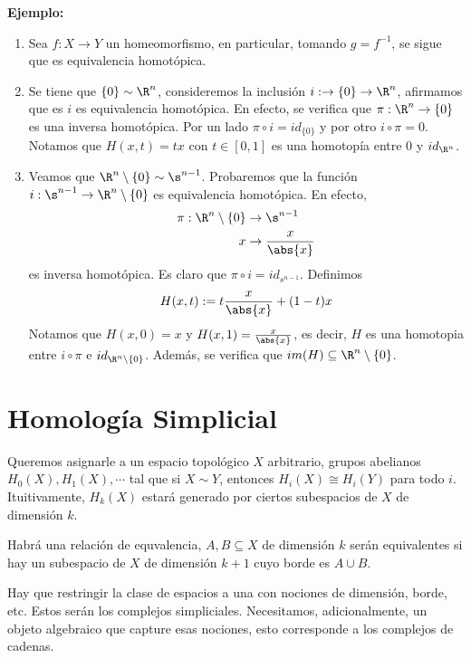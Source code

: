 \documentclass{article}
\begin{document}
\vspace{2mm}
\noindent\textbf{Ejemplo:}
\begin{enumerate}
    \item Sea $f:X\to Y$ un homeomorfismo, en particular, tomando $g=f^{-1}$, se sigue que es 
    equivalencia homotópica.

    \item Se tiene que $\{0\}\sim\R^{n}$, consideremos la inclusión $i:\to\{0\}\to\R^{n}$, 
    afirmamos que es $i$ es equivalencia homotópica. En efecto, se verifica que $\pi:\R^{n}\to
    \{0\}$ es una inversa homotópica. Por un lado $\pi\circ i=id_{\{0\}}$ y por otro 
    $i\circ\pi=0$. Notamos que $H(x,t)=tx$ con $t\in[0,1]$ es una homotopía entre $0$ y 
    $id_{\R^{n}}$.

    \item Veamos que $\R^{n}\setminus\{0\}\sim\s^{n-1}$. Probaremos que la función 
    $i:\s^{n-1}\to\R^{n}\setminus\{0\}$ es equivalencia homotópica. En efecto,
    \begin{align*}
        \pi:\R^{n}\setminus\{0\} &\to \s^{n-1} \\
        x &\to \frac{x}{\abs{x}}
    \end{align*}
    es inversa homotópica. Es claro que $\pi\circ i=id_{s^{n-1}}$. Definimos
    \begin{equation*}
        H(x,t):=t\frac{x}{\abs{x}}+(1-t)x
    \end{equation*}
    Notamos que $H(x,0)=x$ y $H(x,1)=\frac{x}{\abs{x}}$, es decir, $H$ es una homotopia entre 
    $i\circ\pi$ e $id_{\R^{n}\setminus\{0\}}$. Además, se verifica que 
    $im(H)\subseteq\R^{n}\setminus\{0\}$.
\end{enumerate}

\newpage
\section{Homología Simplicial}
\noindent Queremos asignarle a un espacio topológico $X$ arbitrario, grupos abelianos 
$H_{0}(X),H_{1}(X),\cdots$ tal que si $X\sim Y$, entonces $H_{i}(X)\cong H_{i}(Y)$ para todo $i$.
Ituitivamente, $H_{k}(X)$ estará generado por ciertos subespacios de $X$ de dimensión $k$.

\vspace{2mm}
\noindent Habrá una relación de equvalencia, $A,B\subseteq X$ de dimensión $k$ serán equivalentes
si hay un subespacio de $X$ de dimensión $k+1$ cuyo borde es $A\cup B$.

\vspace{2mm}
\noindent Hay que restringir la clase de espacios a una con nociones de dimensión, borde, etc. 
Estos serán los complejos simpliciales. Necesitamos, adicionalmente, un objeto algebraico que 
capture esas nociones, esto corresponde a los complejos de cadenas.
\end{document}
